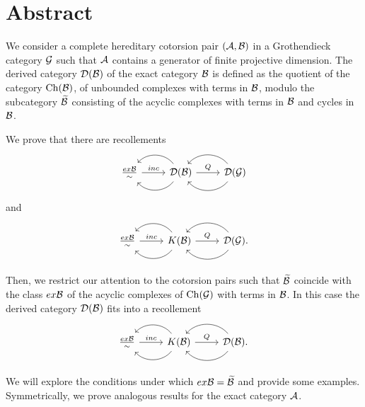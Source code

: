 \begingroup
\let\clearpage\relax
\let\cleardoublepage\relax
\let\cleardoublepage\relax

\chapter*{Abstract}
We consider a complete hereditary cotorsion pair $(\mathcal{A},\mathcal{B})$ in a Grothendieck category $\mathcal{G}$ such that $\mathcal{A}$ contains a generator of finite projective dimension. The derived category $\mathcal{D}(\mathcal{B})$ of the exact category $\mathcal{B}$ is defined as the quotient of the category $\mathrm{Ch}(\mathcal{B})$, of unbounded complexes with terms in $\mathcal{B}$, modulo the subcategory $\widetilde{\mathcal{B}}$ consisting of the acyclic complexes with terms in $\mathcal{B}$ and cycles in $\mathcal{B}$.

We prove that there are recollements
\begin{equation*}
  \begin{tikzcd}
    \frac{ex\B}{\sim}\arrow{r}{inc}
    & \D(\B)\arrow[bend left=50]{l}\arrow[bend right=50]{l}\arrow{r}{Q}
    & \D(\G)\arrow[bend left=50]{l}\arrow[bend right=50]{l}
  \end{tikzcd}
\end{equation*}
and
\begin{equation*}
  \begin{tikzcd}
    \frac{ex\B}{\sim}\arrow{r}{inc}
    & K(\B)\arrow[bend left=50]{l}\arrow[bend right=50]{l}\arrow{r}{Q}
    & \D(\G).\arrow[bend left=50]{l}\arrow[bend right=50]{l}
  \end{tikzcd}
\end{equation*}

Then, we restrict our attention to the cotorsion pairs such that $\widetilde{\mathcal{B}}$ coincide with the class $ex\mathcal{B}$ of the acyclic complexes of $\mathrm{Ch}(\mathcal{G})$ with terms in $\mathcal{B}$. In this case the derived category $\mathcal{D}(\mathcal{B})$ fits into a recollement
\begin{equation*}
  \begin{tikzcd}
    \frac{ex\B}{\sim}\arrow{r}{inc}
    & K(\B)\arrow[bend left=50]{l}\arrow[bend right=50]{l}\arrow{r}{Q}
    & \D(\B).\arrow[bend left=50]{l}\arrow[bend right=50]{l}
  \end{tikzcd}
\end{equation*}

We will explore the conditions under which $ex\mathcal{B}=\widetilde{\mathcal{B}}$ and provide some examples. Symmetrically, we prove analogous results for the exact category $\mathcal{A}$.


